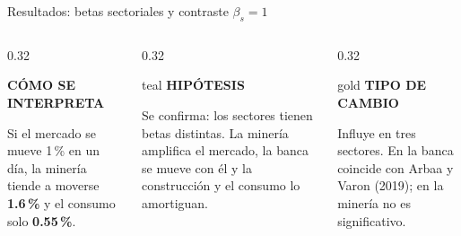 \documentclass[aspectratio=169,10pt]{beamer}
\newcommand{\etiqueta}[2]{{\color{#1}\scriptsize\bfseries\MakeUppercase{#2}}\par\vspace{1mm}}
\begin{document}
\begin{frame}{Resultados: betas sectoriales y contraste $\beta_s = 1$}
\begin{columns}[T]
\begin{column}{0.32\textwidth}
\begin{clave}
\etiqueta{acento}{Cómo se interpreta}
Si el mercado se mueve 1\,\% en un día, la minería tiende a moverse \textbf{1.6\,\%} y el consumo solo \textbf{0.55\,\%}.
\end{clave}
\end{column}
\begin{column}{0.32\textwidth}
\begin{caja}{teal}
\etiqueta{teal}{Hipótesis}
Se confirma: los sectores tienen betas distintas. La minería amplifica el mercado, la banca se mueve con él y la construcción y el consumo lo amortiguan.
\end{caja}
\end{column}
\begin{column}{0.32\textwidth}
\begin{caja}{gold}
\etiqueta{gold!80!black}{Tipo de cambio}
Influye en tres sectores. En la banca coincide con Arbaa y Varon (2019); en la minería no es significativo.
\end{caja}
\end{column}
\end{columns}
\end{frame}
\end{document}
